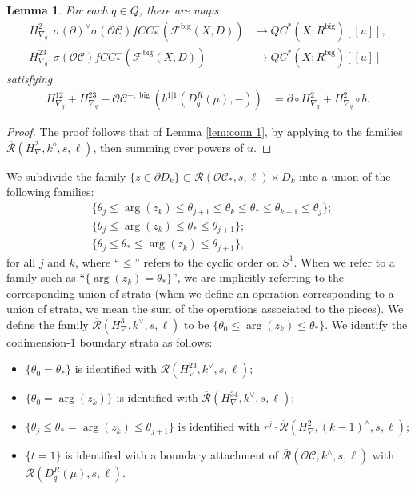 \documentclass{article}
\newtheorem{lem}{Lemma}[section]
\def\fuk{\EuF}
\def\cO{\mathcal{O}}
\def\cC{\mathcal{C}}
\def\fuk{\mathcal{F}}
\def\Rbar{\overline{\mathcal{R}}}
\def\big{{\operatorname{big}}}
\begin{document}
\begin{lem}\label{lem:conn 2}
    For each $q \in Q$, there are maps
    \begin{align*}
        H^2_{\nabla_q}:\sigma(\partial)^\vee \sigma(\cO\cC) fCC_*^-(\fuk^\big(X,D)) & \to QC^*(X;R^\big)[[u]],\\
        H^{23}_{\nabla_q}:\sigma(\cO\cC)fCC_*^-(\fuk^\big(X,D)) &\to QC^*(X;R^\big)[[u]]
    \end{align*}
    satisfying
    \begin{align}\label{eq:H2 nab}
         H^{12}_{\nabla_q} + H^{23}_{\nabla_q}- \cO\cC^{-,\big}(b^{1|1}(D_q^R(\mu),-)) &= \partial \circ H^2_{\nabla_q} + H^2_{\nabla_q} \circ b.
    \end{align}
\end{lem}
\begin{proof}
    The proof follows that of Lemma \ref{lem:conn 1}, by applying \cite[Lemma 4.18]{relfukii} to the families $\Rbar(H^2_\nabla,k^\diamond,s,\ell)$, then summing over powers of $u$.
\end{proof}

We subdivide the family $\{z \in \partial D_k\} \subset \Rbar(\cO\cC_*,s,\ell) \times D_k$ into a union of the following families:
\begin{align*} 
&\{\theta_j \le \arg(z_k) \le \theta_{j+1} \le \theta_k \le \theta_* \le \theta_{k+1} \le \theta_j\}; \\
&\{\theta_j \le \arg(z_k) \le \theta_* \le \theta_{j+1}\}; \\
&\{\theta_j \le \theta_* \le \arg(z_k)\le\theta_{j+1}\},
\end{align*}
for all $j$ and $k$, where ``$\le$'' refers to the cyclic order on $S^1$. 
When we refer to a family such as ``$\{\arg(z_k)=\theta_*\}$'', we are implicitly referring to the corresponding union of strata (when we define an operation corresponding to a union of strata, we mean the sum of the operations associated to the pieces). 
We define the family $\Rbar(H^3_\nabla,k^\vee,s,\ell)$ to be $\{\theta_0 \le \arg(z_k) \le \theta_*\}$. 
We identify the codimension-$1$ boundary strata as follows:
\begin{itemize}
    \item $\{\theta_0 = \theta_*\}$ is identified with $\Rbar(H^{23}_\nabla,k^\vee,s,\ell)$; 
    \item $\{\theta_0=\arg(z_k)\}$ is identified with $\Rbar(H^{34}_\nabla,k^\vee,s,\ell)$;
    \item $\{\theta_j \le \theta_* = \arg(z_k) \le \theta_{j+1}\}$ is identified with $r^j\cdot \Rbar(H^2_\nabla,(k-1)^\wedge,s,\ell)$;
    \item $\{t=1\}$ is identified with a boundary attachment of $\Rbar(\cO\cC,k^\wedge,s,\ell)$ with $\Rbar(D_q^R(\mu),s,\ell)$.
\end{itemize}
\end{document}
